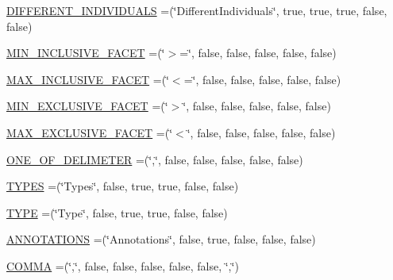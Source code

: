 \begin{DoxyCompactItemize}
\item 
\hyperlink{enumorg_1_1coode_1_1owlapi_1_1manchesterowlsyntax_1_1_manchester_o_w_l_syntax_a6c0982c811e064e1d9f32d9a49e57cb1}{D\-I\-F\-F\-E\-R\-E\-N\-T\-\_\-\-I\-N\-D\-I\-V\-I\-D\-U\-A\-L\-S} =(\char`\"{}Different\-Individuals\char`\"{}, true, true, true, false, false)
\item 
\hyperlink{enumorg_1_1coode_1_1owlapi_1_1manchesterowlsyntax_1_1_manchester_o_w_l_syntax_a4f4bc38f1114fcc0ca72bc15890daa17}{M\-I\-N\-\_\-\-I\-N\-C\-L\-U\-S\-I\-V\-E\-\_\-\-F\-A\-C\-E\-T} =(\char`\"{}$>$=\char`\"{}, false, false, false, false, false)
\item 
\hyperlink{enumorg_1_1coode_1_1owlapi_1_1manchesterowlsyntax_1_1_manchester_o_w_l_syntax_ac7866681283dae34fbde62a255091741}{M\-A\-X\-\_\-\-I\-N\-C\-L\-U\-S\-I\-V\-E\-\_\-\-F\-A\-C\-E\-T} =(\char`\"{}$<$=\char`\"{}, false, false, false, false, false)
\item 
\hyperlink{enumorg_1_1coode_1_1owlapi_1_1manchesterowlsyntax_1_1_manchester_o_w_l_syntax_a9f4f6f506ab50406dcb5b389ea266958}{M\-I\-N\-\_\-\-E\-X\-C\-L\-U\-S\-I\-V\-E\-\_\-\-F\-A\-C\-E\-T} =(\char`\"{}$>$\char`\"{}, false, false, false, false, false)
\item 
\hyperlink{enumorg_1_1coode_1_1owlapi_1_1manchesterowlsyntax_1_1_manchester_o_w_l_syntax_a174c6ec5f85063d7ef7e41178ce84b48}{M\-A\-X\-\_\-\-E\-X\-C\-L\-U\-S\-I\-V\-E\-\_\-\-F\-A\-C\-E\-T} =(\char`\"{}$<$\char`\"{}, false, false, false, false, false)
\item 
\hyperlink{enumorg_1_1coode_1_1owlapi_1_1manchesterowlsyntax_1_1_manchester_o_w_l_syntax_a89b753a49db407dbab99b5e2d8292208}{O\-N\-E\-\_\-\-O\-F\-\_\-\-D\-E\-L\-I\-M\-E\-T\-E\-R} =(\char`\"{},\char`\"{}, false, false, false, false, false)
\item 
\hyperlink{enumorg_1_1coode_1_1owlapi_1_1manchesterowlsyntax_1_1_manchester_o_w_l_syntax_a601deeb2c82d7fb240b0da4f707a181c}{T\-Y\-P\-E\-S} =(\char`\"{}Types\char`\"{}, false, true, true, false, false)
\item 
\hyperlink{enumorg_1_1coode_1_1owlapi_1_1manchesterowlsyntax_1_1_manchester_o_w_l_syntax_a582e2d24d16b4ed2792b5ee01069b5f1}{T\-Y\-P\-E} =(\char`\"{}Type\char`\"{}, false, true, true, false, false)
\item 
\hyperlink{enumorg_1_1coode_1_1owlapi_1_1manchesterowlsyntax_1_1_manchester_o_w_l_syntax_a504fde3a4a90742236cd5021d7dc989d}{A\-N\-N\-O\-T\-A\-T\-I\-O\-N\-S} =(\char`\"{}Annotations\char`\"{}, false, true, false, false, false)
\item 
\hyperlink{enumorg_1_1coode_1_1owlapi_1_1manchesterowlsyntax_1_1_manchester_o_w_l_syntax_a35e5a72a471bbef7f29c43fc237ab199}{C\-O\-M\-M\-A} =(\char`\"{},\char`\"{}, false, false, false, false, false, \char`\"{},\char`\"{})

\end{DoxyCompactItemize}
